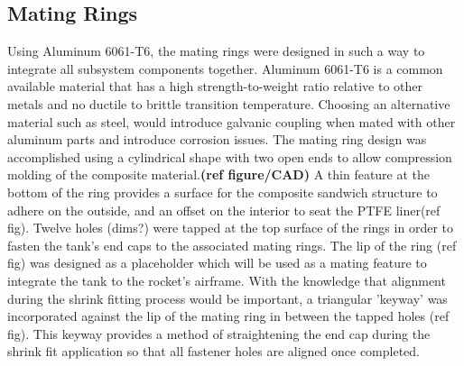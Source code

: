  
\subsection{Mating Rings}


Using Aluminum 6061-T6, the mating rings were designed in such a way to integrate all subsystem components together. Aluminum 6061-T6 is a common available material that has a high strength-to-weight ratio relative to other metals and no ductile to brittle transition temperature. Choosing an alternative material such as steel, would introduce galvanic coupling when mated with other aluminum parts and introduce corrosion issues. The mating ring design was accomplished using a cylindrical shape with two open ends to allow compression molding of the composite material.\textbf{(ref figure/CAD)} A thin feature at the bottom of the ring provides a surface for the composite sandwich structure to adhere on the outside, and an offset on the interior to seat the PTFE liner(ref fig). Twelve holes (dims?) were tapped at the top surface of the rings in order to fasten the tank’s end caps to the associated mating rings. The lip of the ring (ref fig) was designed as a placeholder which will be used as a mating feature to integrate the tank to the rocket’s airframe. With the knowledge that alignment during the shrink fitting process would be important, a triangular 'keyway' was incorporated against the lip of the mating ring in between the tapped holes (ref fig).  This keyway provides a method of straightening the end cap during the shrink fit application so that all fastener holes are aligned once completed.

